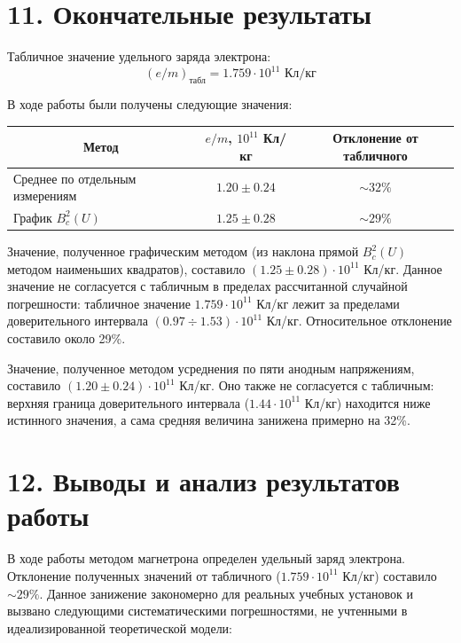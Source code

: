 \documentclass[a4paper,12pt]{article}
\begin{document}
\section*{\hspace{30pt}11. Окончательные результаты}

\hspace{15pt} Табличное значение удельного заряда электрона:
\begin{equation*}
    (e/m)_{\text{табл}} = 1.759 \cdot 10^{11} \text{ Кл/кг}
\end{equation*}

В ходе работы были получены следующие значения:

\begin{table}[H]
    \centering
    \begin{tabular}{|l|c|c|}
        \hline
        \multicolumn{1}{|c|}{Метод} & $e/m$, $10^{11}$ Кл/кг & Отклонение от табличного \\ \hline
        Среднее по отдельным измерениям & $1.20 \pm 0.24$ & $\sim 32\%$ \\ \hline
        График $B_c^2(U)$ & $1.25 \pm 0.28$ & $\sim 29\%$ \\ \hline
    \end{tabular}
\end{table}

\hspace{15pt} Значение, полученное графическим методом (из наклона прямой $B_c^2(U)$ методом наименьших квадратов), составило $(1.25 \pm 0.28) \cdot 10^{11}$ Кл/кг. Данное значение не согласуется с табличным в пределах рассчитанной случайной погрешности: табличное значение $1.759 \cdot 10^{11}$ Кл/кг лежит за пределами доверительного интервала $(0.97 \div 1.53) \cdot 10^{11}$ Кл/кг. Относительное отклонение составило около 29\%.

\hspace{15pt} Значение, полученное методом усреднения по пяти анодным напряжениям, составило $(1.20 \pm 0.24) \cdot 10^{11}$ Кл/кг. Оно также не согласуется с табличным: верхняя граница доверительного интервала ($1.44 \cdot 10^{11}$ Кл/кг) находится ниже истинного значения, а сама средняя величина занижена примерно на 32\%.

\section*{\hspace{30pt}12. Выводы и анализ результатов работы}

\hspace{15pt} В ходе работы методом магнетрона определен удельный заряд электрона. Отклонение полученных значений от табличного ($1.759 \cdot 10^{11}$ Кл/кг) составило $\sim 29\%$. Данное занижение закономерно для реальных учебных установок и вызвано следующими систематическими погрешностями, не учтенными в идеализированной теоретической модели:
\end{document}
